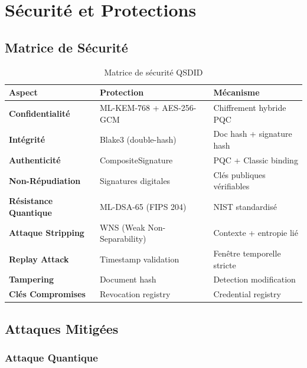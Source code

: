 \documentclass[12pt,a4paper]{report}
\begin{document}
\chapter{Sécurité et Protections}

\section{Matrice de Sécurité}

\begin{table}[H]
\centering
\begin{tabular}{|l|l|l|}
\hline
\textbf{Aspect} & \textbf{Protection} & \textbf{Mécanisme} \\
\hline
\textbf{Confidentialité} & ML-KEM-768 + AES-256-GCM & Chiffrement hybride PQC \\
\hline
\textbf{Intégrité} & Blake3 (double-hash) & Doc hash + signature hash \\
\hline
\textbf{Authenticité} & CompositeSignature & PQC + Classic binding \\
\hline
\textbf{Non-Répudiation} & Signatures digitales & Clés publiques vérifiables \\
\hline
\textbf{Résistance Quantique} & ML-DSA-65 (FIPS 204) & NIST standardisé \\
\hline
\textbf{Attaque Stripping} & WNS (Weak Non-Separability) & Contexte + entropie lié \\
\hline
\textbf{Replay Attack} & Timestamp validation & Fenêtre temporelle stricte \\
\hline
\textbf{Tampering} & Document hash & Detection modification \\
\hline
\textbf{Clés Compromises} & Revocation registry & Credential registry \\
\hline
\end{tabular}
\caption{Matrice de sécurité QSDID}
\end{table}

\section{Attaques Mitigées}

\subsection{Attaque Quantique}
\end{document}
